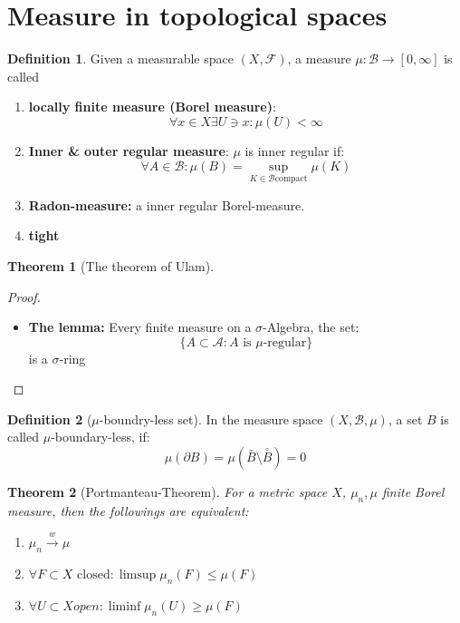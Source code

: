 \documentclass[a4paper,11pt,oneside,fleqn]{book}
\newtheorem{theorem}{Theorem}[section]
\theoremstyle{definition}
\newtheorem{definition}{Definition}[section]
\theoremstyle{remark}
\begin{document}
\section{Measure in topological spaces}
\begin{definition}
	Given a measurable space $(X, \mathcal{F})$, a measure $\mu: \mathcal{B} \rightarrow [0, \infty]$ is called 
	\begin{enumerate}
		\item \textbf{locally finite measure (Borel measure)}: 
			\begin{equation*}
				\forall x \in X \exists U \ni x: \mu(U) < \infty
			\end{equation*}
		\item \textbf{Inner \& outer regular measure}: $\mu$ is inner regular if:
			\begin{equation*}
				\forall A \in \mathcal{B}: \mu(B) = \sup_{K \in \mathcal{B} \text{compact}} \mu(K) 
			\end{equation*}
		\item \textbf{Radon-measure:} a inner regular Borel-measure.
		\item \textbf{tight}
	\end{enumerate}
\end{definition}

\begin{theorem}[The theorem of Ulam]
\end{theorem}

\begin{proof}
	\begin{itemize}
		\item \textbf{The lemma:} Every finite measure on a $\sigma$-Algebra, the set:
			\begin{equation*}
				\{A \subset \mathcal{A}: A \text{ is  $\mu$-regular}\}
			\end{equation*}
			is a $\sigma$-ring
	\end{itemize}
\end{proof}

\begin{definition}[$\mu$-boundry-less set]
In the measure space $(X, \mathcal{B}, \mu)$, a set $B$ is called $\mu$-boundary-less, if:
\begin{equation*}
	\mu(\partial B) = \mu(\bar{B} \setminus \overset{\circ}{B}) = 0
\end{equation*}
\end{definition}

\begin{theorem}[Portmanteau-Theorem]
	For a metric space $X$, $\mu_n, \mu$ finite Borel measure, then the followings are equivalent:
	\begin{enumerate}
		\item $\mu_n \overset{w}{\rightarrow} \mu$
		\item $\forall F \subset X \text{ closed}: \limsup \mu_n(F) \leq \mu(F)$
		\item $\forall U \subset X open: \liminf \mu_n(U) \geq \mu(F)$
	\end{enumerate}
\end{theorem}
\newpage
\end{document}

